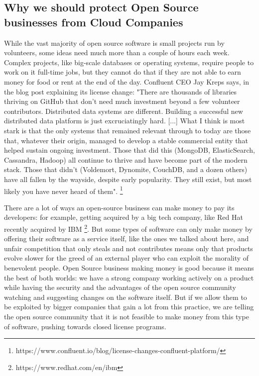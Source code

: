 \documentclass[12pt, a4paper]{article}
\begin{document}
  \subsection{Why we should protect Open Source businesses from Cloud Companies}
  While the vast majority of open source software is small projects run by volunteers, some ideas need much more than a couple of hours each week. Complex projects, like big-scale databases or operating systems, require people to work on it full-time jobs, but they cannot do that if they are not able to earn money for food or rent at the end of the day. Confluent CEO Jay Kreps says, in the blog post explaining its license change: "There are thousands of libraries thriving on GitHub that don't need much investment beyond a few volunteer contributors. Distributed data systems are different. Building a successful new distributed data platform is just excruciatingly hard. [...] What I think is most stark is that the only systems that remained relevant through to today are those that, whatever their origin, managed to develop a stable commercial entity that helped sustain ongoing investment. Those that did this (MongoDB, ElasticSearch, Cassandra, Hadoop) all continue to thrive and have become part of the modern stack. Those that didn't (Voldemort, Dynomite, CouchDB, and a dozen others) have all fallen by the wayside, despite early popularity. They still exist, but most likely you have never heard of them". \footnote{https://www.confluent.io/blog/license-changes-confluent-platform/}
  
  There are a lot of ways an open-source business can make money to pay its developers: for example, getting acquired by a big tech company, like Red Hat recently acquired by IBM \footnote{https://www.redhat.com/en/ibm}. But some types of software can only make money by offering their software as a service itself, like the ones we talked about here, and unfair competition that only steals and not contributes means only that products evolve slower for the greed of an external player who can exploit the morality of benevolent people. Open Source business making money is good because it means the best of both worlds: we have a strong company working actively on a product while having the security and the advantages of the open source community watching and suggesting changes on the software itself. But if we allow them to be exploited by bigger companies that gain a lot from this practice, we are telling the open source community that it is not feasible to make money from this type of software, pushing towards closed license programs.
\end{document}
